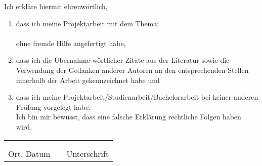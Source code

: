Ich erkläre hiermit ehrenwörtlich,
\begin{flushleft}
\begin{enumerate}[leftmargin=0.5cm]
	\item 	dass ich meine Projektarbeit mit dem Thema:  \\
	\vspace*{1cm}
			\textbf{\CTITLE} \\
	\vspace*{1cm}
			ohne fremde Hilfe angefertigt habe, \\
	\item	dass ich die Übernahme wörtlicher Zitate aus der Literatur sowie die Verwendung der
			Gedanken anderer Autoren an den entsprechenden Stellen innerhalb der Arbeit gekennzeichnet habe und  \\
	\item	dass ich meine Projektarbeit/Studienarbeit/Bachelorarbeit bei keiner anderen Prüfung vorgelegt habe. \\
	\vspace*{1cm}
			Ich bin mir bewusst, dass eine falsche Erklärung rechtliche Folgen haben wird. \\
\end{enumerate}
\end{flushleft}
\vspace*{\fill}
\begin{tabular} {lrl}
	\hspace{5.5cm} & \hspace{3cm} & \hspace{5.5cm} \\
	\hrulefill & & \hrulefill \\
	Ort, Datum & & Unterschrift
\end{tabular}
\vspace*{\fill}
